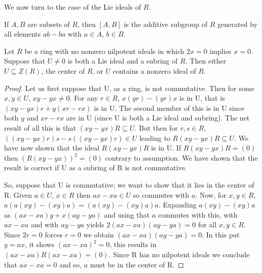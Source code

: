 \documentclass{article}
\begin{document}
We now turn to the case of the Lie ideals of $R$.  

\begin{definition}\label{def:1.6}  
If $A,B$ are subsets of $R$, then $[A,B]$ is the additive subgroup of $R$ generated by all elements $ab - ba$ with $a \in A$, $b \in B$.  
\end{definition}  

\begin{lemma}\label{lem:1.7}  
Let $R$ be a ring with no nonzero nilpotent ideals in which $2x=0$ implies $x=0$. Suppose that $U\neq 0$ is both a Lie ideal and a subring of $R$. Then either $U\subseteq Z(R)$, the center of $R$, or $U$ contains a nonzero ideal of $R$.  
\end{lemma}  

\begin{proof}  
Let us first suppose that U, as a ring, is not commutative. Then for some $x, y \in U$, $xy - yx \neq 0$. For any $r \in R$, $x(yr) - (yr)x$ is in U, that is $(xy - yx)r + y(xr - rx)$ is in U. The second member of this is in U since both $y$ and $xr - rx$ are in U (since U is both a Lie ideal and subring). The net result of all this is that $(xy - yx)R \subseteq U$. But then for $r, s \in R$, $((xy - yx)r)s - s((xy - yx)r) \in U$ leading to $R(xy - yx)R \subseteq U$. We have now shown that the ideal $R(xy - yx)R$ is in U. If $R(xy - yx)R = (0)$ then $(R(xy - yx))^2 = (0)$ contrary to assumption. We have shown that the result is correct if U as a subring of R is not commutative.  

So, suppose that U is commutative; we want to show that it lies in the center of R. Given $a \in U$, $x \in R$ then $ax - xa \in U$ so commutes with $a$. Now, for $x, y \in R$, $a(a(xy) - (xy)a) = (a(xy) - (xy)a)a$. Expanding $a(xy) - (xy)a$ as $(ax - xa)y + x(ay - ya)$ and using that $a$ commutes with this, with $ax - xa$ and with $ay - ya$ yields $2(ax - xa)(ay - ya) = 0$ for all $x, y \in R$. Since $2r = 0$ forces $r = 0$ we obtain $(ax - xa)(ay - ya) = 0$. In this put $y=ax$, it shows $ (ax-xa)^2=0 $, this results in $(ax - xa)R(ax - xa) = (0)$. Since R has no nilpotent ideals we conclude that $ax - xa = 0$ and so, $a$ must be in the center of R.  
\end{proof}  
\end{document}
